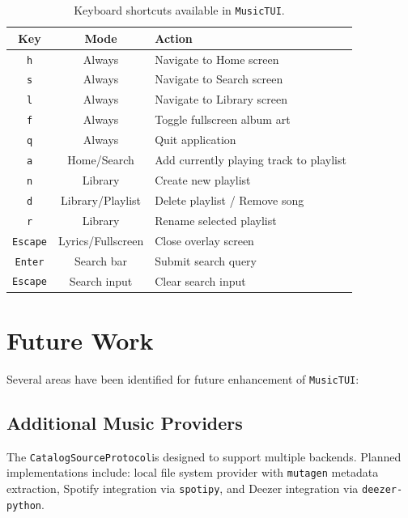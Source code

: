 \documentclass[a4paper,11pt,twoside]{article}
\newcommand{\musictui}{\texttt{MusicTUI}}
\newcommand{\protocol}{\texttt{Protocol}}
\newcommand{\catalogsource}{\texttt{CatalogSource}}
\begin{document}
\begin{table}[H]
\centering
\caption{Keyboard shortcuts available in \musictui.}
\label{tab:keybindings}
\begin{tabular}{ccp{8cm}}
\toprule
\textbf{Key} & \textbf{Mode} & \textbf{Action} \\
\midrule
\texttt{h} & Always & Navigate to Home screen \\
\texttt{s} & Always & Navigate to Search screen \\
\texttt{l} & Always & Navigate to Library screen \\
\texttt{f} & Always & Toggle fullscreen album art \\
\texttt{q} & Always & Quit application \\
\texttt{a} & Home/Search & Add currently playing track to playlist \\
\texttt{n} & Library & Create new playlist \\
\texttt{d} & Library/Playlist & Delete playlist / Remove song \\
\texttt{r} & Library & Rename selected playlist \\
\texttt{Escape} & Lyrics/Fullscreen & Close overlay screen \\
\texttt{Enter} & Search bar & Submit search query \\
\texttt{Escape} & Search input & Clear search input \\
\bottomrule
\end{tabular}

\end{table}

\section{Future Work}

Several areas have been identified for future enhancement of \musictui:

\subsection{Additional Music Providers}
The \catalogsource \protocol is designed to support multiple backends.
Planned implementations include: local file system provider with
\texttt{mutagen} metadata extraction, Spotify integration via \texttt{spotipy},
and Deezer integration via \texttt{deezer-python}.
\end{document}
